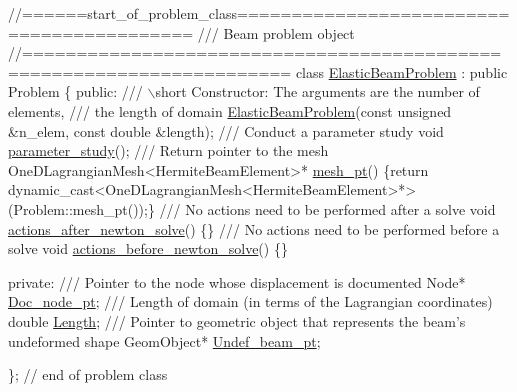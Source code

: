  
\begin{DoxyCodeInclude}
\textcolor{comment}{//======start\_of\_problem\_class==========================================}
\textcolor{comment}{/// Beam problem object}
\textcolor{comment}{}\textcolor{comment}{//======================================================================}
\textcolor{keyword}{class }\hyperlink{classElasticBeamProblem}{ElasticBeamProblem} : \textcolor{keyword}{public} Problem
\{
\textcolor{keyword}{public}:
 \textcolor{comment}{}
\textcolor{comment}{ /// \(\backslash\)short Constructor: The arguments are the number of elements, }
\textcolor{comment}{ /// the length of domain}
\textcolor{comment}{} \hyperlink{classElasticBeamProblem_a1c62c2a14c9a5528a649700d16dac2ea}{ElasticBeamProblem}(\textcolor{keyword}{const} \textcolor{keywordtype}{unsigned} &n\_elem, \textcolor{keyword}{const} \textcolor{keywordtype}{double} &length);
 \textcolor{comment}{}
\textcolor{comment}{ /// Conduct a parameter study}
\textcolor{comment}{} \textcolor{keywordtype}{void} \hyperlink{classElasticBeamProblem_a2da3cb02ce953da67fb27742e20774a5}{parameter\_study}();
 \textcolor{comment}{}
\textcolor{comment}{ /// Return pointer to the mesh}
\textcolor{comment}{} OneDLagrangianMesh<HermiteBeamElement>* \hyperlink{classElasticBeamProblem_ae7d14ba8bec2325a82cbeed0c1b29910}{mesh\_pt}() 
  \{\textcolor{keywordflow}{return} \textcolor{keyword}{dynamic\_cast<}OneDLagrangianMesh<HermiteBeamElement>*\textcolor{keyword}{>}
    (Problem::mesh\_pt());\}
\textcolor{comment}{}
\textcolor{comment}{ /// No actions need to be performed after a solve}
\textcolor{comment}{} \textcolor{keywordtype}{void} \hyperlink{classElasticBeamProblem_a30dde8d0101a3d3994965d6e560cb585}{actions\_after\_newton\_solve}() \{\}
\textcolor{comment}{}
\textcolor{comment}{ /// No actions need to be performed before a solve}
\textcolor{comment}{} \textcolor{keywordtype}{void} \hyperlink{classElasticBeamProblem_a5b534c11d9b1d54123bf587aad5f98f6}{actions\_before\_newton\_solve}() \{\}

\textcolor{keyword}{private}:
\textcolor{comment}{}
\textcolor{comment}{ /// Pointer to the node whose displacement is documented}
\textcolor{comment}{} Node* \hyperlink{classElasticBeamProblem_a9c96cab7e71243e51f7c4040a84cdd5d}{Doc\_node\_pt};
\textcolor{comment}{}
\textcolor{comment}{ /// Length of domain (in terms of the Lagrangian coordinates)}
\textcolor{comment}{} \textcolor{keywordtype}{double} \hyperlink{classElasticBeamProblem_aa68b1c77e0aa1571fe956d62bd8cf096}{Length};
\textcolor{comment}{}
\textcolor{comment}{ /// Pointer to geometric object that represents the beam's undeformed shape}
\textcolor{comment}{} GeomObject* \hyperlink{classElasticBeamProblem_a134a789cae77ab61a3e32bd93b28e1fa}{Undef\_beam\_pt};

\}; \textcolor{comment}{// end of problem class}

\end{DoxyCodeInclude}




